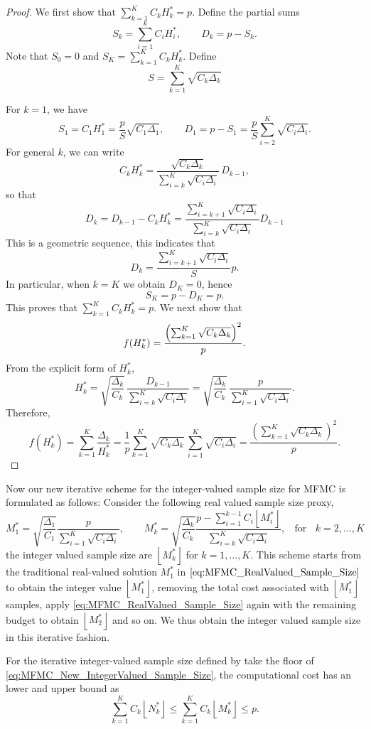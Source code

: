 \begin{proof}
We first show that $\sum_{k=1}^K C_kH_k^* = p$.  
Define the partial sums
\[
    S_k = \sum_{i=1}^k C_iH_i^*, 
    \qquad 
    D_k = p - S_k .
\]
Note that $S_0 = 0$ and $S_K = \sum_{k=1}^K C_kH_k^*$.  Define
\[
S = \sum_{k=1}^K\sqrt{C_k\Delta_k}
\]

For $k=1$, we have
\[
    S_1 = C_1H_1^* 
    = \frac{p}{S}\sqrt{C_1\Delta_1},
    \qquad
    D_1 = p-S_1
    = \frac{p}{S}\sum_{i=2}^K \sqrt{C_i\Delta_i}.
\]
For general $k$, we can write
%
\[
    C_kH_k^* 
    = \frac{\sqrt{C_k\Delta_k}}{\sum_{i=k}^K \sqrt{C_i\Delta_i}}\,D_{k-1},
\]
%
so that
%
\[
D_k=D_{k-1}-C_kH_k^*=\frac{\sum_{i=k+1}^K\sqrt{C_i\Delta_i}}{\sum_{i=k}^K\sqrt{C_i\Delta_i}}D_{k-1}
\]
%
This is a geometric sequence, this indicates that 
\[
D_k=\frac{\sum_{i=k+1}^K\sqrt{C_i\Delta_i}}{S}p.
\]
In particular, when $k=K$ we obtain $D_K=0$, hence
\[
    S_K = p - D_K = p.
\]
This proves that $\sum_{k=1}^K C_kH_k^* = p$. We next show that
\[
    f(H_k^*) = \frac{\Bigl(\sum_{k=1}^K \sqrt{C_k\Delta_k}\Bigr)^2}{p}.
\]
From the explicit form of $H_k^*$,
\[
    H_k^*
    = \sqrt{\frac{\Delta_k}{C_k}}\,
      \frac{D_{k-1}}{\sum_{i=k}^K \sqrt{C_i\Delta_i}}
    = \sqrt{\frac{\Delta_k}{C_k}}\,
      \frac{p}{\sum_{i=1}^K \sqrt{C_i\Delta_i}}.
\]
Therefore,
\[
    f(H_k^*)=\sum_{k=1}^K \frac{\Delta_k}{H_k^*}
    = \frac{1}{p}\sum_{k=1}^K \sqrt{C_k\Delta_k}\,
      \sum_{i=1}^K \sqrt{C_i\Delta_i}
    = \frac{\left(\sum_{k=1}^K \sqrt{C_k\Delta_k}\right)^2}{p}.
\]


\end{proof}
%
Now our new iterative scheme for the integer-valued sample size for MFMC is formulated as follows:
Consider the following real valued sample size proxy,
\begin{equation}
    \label{eq:MFMC_New_IntegerValued_Sample_Size}
    M_1^* = \sqrt{\frac{\Delta_1}{C_1}}\frac{p}{\sum_{i=1}^K\sqrt{C_i\Delta_i}}, \qquad M_k^* = \sqrt{\frac{\Delta_k}{C_k}}\frac{p-\sum_{i=1}^{k-1}C_i\left\lfloor M_i^* \right\rfloor}{\sum_{i=k}^K\sqrt{C_i\Delta_i}}, \;\;\text{ for }\;\; k = 2,\ldots, K
\end{equation}
the integer valued sample size are $\left\lfloor M_k^* \right\rfloor$ for $k = 1,\ldots, K$. This scheme starts from the traditional real-valued solution $M_1^*$ in $\eqref{eq:MFMC_RealValued_Sample_Size}$ to obtain the integer value $\left\lfloor M_1^* \right\rfloor$, removing the total cost associated with $\left\lfloor M_1^* \right\rfloor$ samples, apply \eqref{eq:MFMC_RealValued_Sample_Size} again with the remaining budget to obtain $\left\lfloor M_2^* \right\rfloor$ and so on. We thus obtain the integer valued sample size in this iterative fashion.
%
\begin{theorem}\label{thm:MFMC_New_IntegerValued_Cost} For the iterative integer-valued sample size defined by take the floor of \eqref{eq:MFMC_New_IntegerValued_Sample_Size}, the computational cost has an lower and upper bound as
%
\[
\sum_{k=1}^K C_k\left\lfloor N_k^* \right\rfloor\le \sum_{k=1}^K C_k\left\lfloor M_k^* \right\rfloor\le p.
\]
%
\end{theorem}





